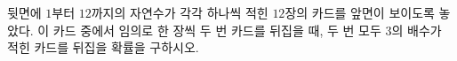뒷면에 $1$부터 $12$까지의 자연수가 각각 하나씩 적힌 $12$장의 카드를 앞면이 보이도록 놓았다. 이 카드 중에서 임의로 한 장씩 두 번 카드를 뒤집을 때, 두 번 모두 $3$의 배수가 적힌 카드를 뒤집을 확률을 구하시오. 
